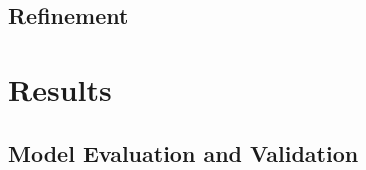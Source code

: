 \documentclass[a4paper,10pt]{article}
\begin{document}
\subsection{Refinement}

\section{Results}

\subsection{Model Evaluation and Validation}

\end{document}
